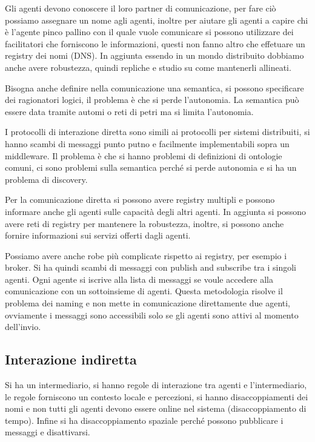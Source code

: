 Gli agenti devono conoscere il loro partner di comunicazione, per fare ciò possiamo 
assegnare un nome agli agenti, inoltre per aiutare gli agenti a capire chi è l'agente 
pinco pallino con il quale vuole comunicare si possono utilizzare dei facilitatori
che forniscono le informazioni, questi non fanno altro che effetuare un registry
dei nomi (DNS). In aggiunta essendo in un mondo distribuito dobbiamo anche avere 
robustezza, quindi repliche e studio su come mantenerli allineati.

Bisogna anche definire nella comunicazione una semantica, si possono specificare 
dei ragionatori logici, il problema è che si perde l'autonomia.
La semantica può essere data tramite automi o reti di petri ma si limita l'autonomia.

I protocolli di interazione diretta  sono simili ai protocolli per sistemi distribuiti,
si hanno scambi di messaggi punto putno e facilmente implementabili sopra un middleware.
Il problema è che si hanno problemi di definizioni di ontologie comuni, ci sono 
problemi sulla semantica perché si perde autonomia e si ha un problema di discovery.

Per la comunicazione diretta si possono avere registry multipli e possono informare 
anche gli agenti sulle capacità degli altri agenti. In aggiunta si possono avere 
reti di registry per mantenere la robustezza, inoltre, si possono anche fornire
informazioni sui servizi offerti dagli agenti.

Possiamo avere anche robe più complicate rispetto ai registry, per esempio i broker.
Si ha quindi scambi di messaggi con publish and subscribe tra i singoli agenti.
Ogni agente si iscrive alla lista di messaggi se voule accedere alla comunicazione 
con un sottoinsieme di agenti. Questa metodologia risolve il problema dei naming
e non mette in comunicazione direttamente due agenti, ovviamente i messaggi sono 
accessibili solo se gli agenti sono attivi al momento dell'invio. 

\subsection{Interazione indiretta}
Si ha un intermediario, si hanno regole di interazione tra agenti e l'intermediario,
le regole forniscono un contesto locale e percezioni, si hanno disaccoppiamenti 
dei nomi e non tutti gli agenti devono essere online nel sistema (disaccoppiamento di tempo).
Infine si ha disaccoppiamento spaziale perché possono pubblicare i messaggi e
disattivarsi.


